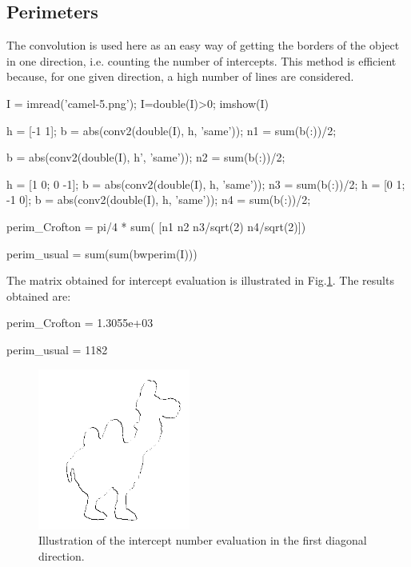 \def\QRCODE{TB_image_TUT.IMG.image_characterization_matlabqrcode.png}
\def\QRPAGE{http://www.iptutorials.science/tree/master/TB_image/TUT.IMG.image_characterization/matlab}

\subsection{Perimeters}
The convolution is used here as an easy way of getting the borders of the object in one direction, i.e. counting the number of intercepts. This method is efficient because, for one given direction, a high number of lines are considered.

\begin{matlab}
I = imread('camel-5.png');
I=double(I)>0; %
imshow(I)

h = [-1 1];
b = abs(conv2(double(I), h, 'same'));
n1 = sum(b(:))/2;

b = abs(conv2(double(I), h', 'same'));
n2 = sum(b(:))/2;

h = [1 0; 0 -1];
b = abs(conv2(double(I), h, 'same'));
n3 = sum(b(:))/2;
h = [0 1; -1 0];
b = abs(conv2(double(I), h, 'same'));
n4 = sum(b(:))/2;

perim_Crofton = pi/4 * sum( [n1 n2 n3/sqrt(2) n4/sqrt(2)])

perim_usual = sum(sum(bwperim(I)))
\end{matlab}

The  matrix obtained for intercept evaluation is illustrated in Fig.\ref{fig:image_characterization:matlab:edges}. The results obtained are:
\begin{mwindow}
perim_Crofton =
   1.3055e+03

perim_usual =
        1182
\end{mwindow}

\begin{figure}[htbp]
\centering
\includegraphics[width=5cm]{contours_diag_1.png}
\caption{Illustration of the intercept number evaluation in the first diagonal direction.}
 \label{fig:image_characterization:matlab:edges}
\end{figure}


